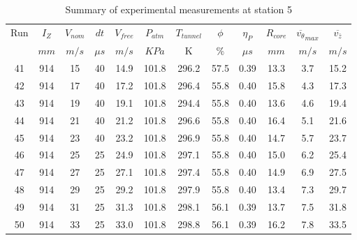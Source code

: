\begin{table}[H]
\begin{center}
\begin{tabular}{|cccccccccccc|}
	\hline
	Run & $I_Z$ & $V_{nom}$ & $dt$ & $V_{free}$ & $P_{atm}$ & $T_{tunnel}$ & $\phi$ & $\eta_P$ & $R_{core}$ & $\overline{v_{\theta}}_{max}$ & $\overline{v_{\bar{z}}}$\\
	  & $mm$ & $m/s$ & $\mu s$ & $m/s$ & $KPa$ & K & $\%$ & $\mu s$ & $mm$ & $m/s$ & $m/s$\\
	\hline
	41 & 914 & 15 & 40 & 14.9 & 101.8 & 296.2 & 57.5 & 0.39 & 13.3 & 3.7 & 15.2\\
	42 & 914 & 17 & 40 & 17.2 & 101.8 & 296.4 & 55.8 & 0.40 & 15.8 & 4.3 & 17.3\\
	43 & 914 & 19 & 40 & 19.1 & 101.8 & 294.4 & 55.8 & 0.40 & 13.6 & 4.6 & 19.4\\
	44 & 914 & 21 & 40 & 21.2 & 101.8 & 296.6 & 55.8 & 0.40 & 16.4 & 5.1 & 21.6\\
	45 & 914 & 23 & 40 & 23.2 & 101.8 & 296.9 & 55.8 & 0.40 & 14.7 & 5.7 & 23.7\\
	46 & 914 & 25 & 25 & 24.9 & 101.8 & 297.1 & 55.8 & 0.40 & 15.0 & 6.2 & 25.4\\
	47 & 914 & 27 & 25 & 27.1 & 101.8 & 297.4 & 55.8 & 0.40 & 14.9 & 6.9 & 27.5\\
	48 & 914 & 29 & 25 & 29.2 & 101.8 & 297.9 & 55.8 & 0.40 & 13.4 & 7.3 & 29.7\\
	49 & 914 & 31 & 25 & 31.3 & 101.8 & 298.1 & 56.1 & 0.39 & 13.7 & 7.5 & 31.8\\
	50 & 914 & 33 & 25 & 33.0 & 101.8 & 298.8 & 56.1 & 0.39 & 16.2 & 7.8 & 33.5\\
	\hline
\end{tabular}
\caption{Summary of experimental measurements at station 5}
\label{table:experiment_results_5}
\end{center}
\end{table}
